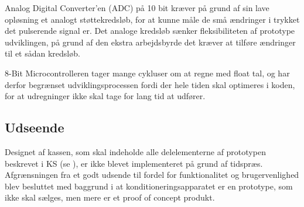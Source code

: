 Analog Digital Converter'en (ADC) på 10 bit kræver på grund af sin lave opløsning et analogt støttekredsløb, for at kunne måle de små ændringer i trykket det pulserende signal er. Det analoge kredsløb sænker fleksibiliteten af prototype udviklingen, på grund af den ekstra arbejdsbyrde det kræver at tilføre ændringer til et sådan kredsløb.

8-Bit Microcontrolleren tager mange cykluser om at regne med float tal, og har derfor begrænset udviklingsprocessen fordi der hele tiden skal optimeres i koden, for at udregninger ikke skal tage for lang tid at udfører.


\subsection{Udseende}
Designet af kassen, som skal indeholde alle delelementerne af prototypen beskrevet i KS (se ), er ikke blevet implementeret på grund af tidspræs. Afgrænsningen fra et godt udsende til fordel for funktionalitet og brugervenlighed blev besluttet med baggrund i at konditioneringsapparatet er en prototype, som ikke skal sælges, men mere er et proof of concept produkt. 
